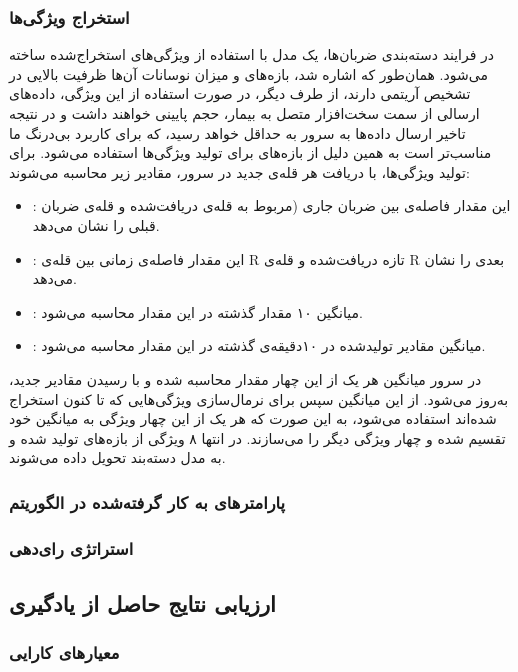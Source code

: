 		\subsubsection{استخراج ویژگی‌ها}
		در فرایند دسته‌بندی ضربان‌‌ها، یک مدل   با استفاده از ویژگی‌های استخراج‌شده ساخته می‌شود. همان‌طور که اشاره شد، بازه‌های  و میزان نوسانات آن‌ها ظرفیت بالایی در تشخیص آریتمی دارند، از طرف دیگر، در صورت استفاده از این ویژگی، داده‌های ارسالی از سمت سخت‌افزار متصل به بیمار، حجم پایینی خواهند داشت و در نتیجه تاخیر ارسال داده‌ها به سرور به حداقل خواهد رسید، که برای کاربرد بی‌درنگ ما مناسب‌تر است به همین دلیل از بازه‌های  برای تولید ویژگی‌ها استفاده می‌شود.
برای تولید ویژگی‌ها، با دریافت هر قله‌ی  جدید در سرور، مقادیر زیر محاسبه می‌شوند:
\begin{itemize}
	\item {}: این مقدار فاصله‌ی بین ضربان جاری (مربوط به قله‌ی  دریافت‌شده و قله‌ی ضربان قبلی را نشان می‌دهد.
	\item {}: این مقدار فاصله‌ی زمانی بین قله‌ی R تازه دریافت‌شده و قله‌ی R بعدی را نشان می‌دهد.
	\item {}: میانگین ۱۰ مقدار  گذشته در این مقدار محاسبه می‌شود.
	\item {}: میانگین مقادیر   تولیدشده در ۱۰دقیقه‌ی گذشته در این مقدار محاسبه می‌شود.
\end{itemize}

	در سرور میانگین هر یک از این چهار مقدار محاسبه شده و با رسیدن مقادیر جدید، به‌روز می‌شود. از این میانگین سپس برای نرمال‌سازی ویژگی‌هایی که تا کنون استخراج شده‌اند استفاده می‌شود، به این صورت که هر یک از این چهار ویژگی به میانگین خود تقسیم شده و چهار ویژگی دیگر را می‌سازند. در انتها ۸ ویژگی از بازه‌های  تولید شده و به مدل دسته‌بند تحویل داده می‌شوند.

		
		\subsubsection{پارامترهای به کار گرفته‌شده در الگوریتم}
		
		\subsubsection{استراتژی رای‌دهی}

	\subsection{ارزیابی نتایج حاصل از یادگیری}
	
		\subsubsection{معیارهای کارایی}

